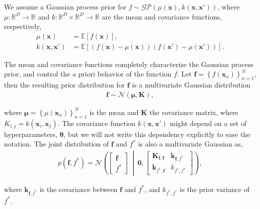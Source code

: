 \documentclass[]{interact}
\theoremstyle{plain}%
\theoremstyle{definition}
\theoremstyle{remark}
\begin{document}
We assume a Gaussian process prior for $f \sim \mathcal{GP}(\mu(\mathbf{x}), k(\mathbf{x}, \mathbf{x}'))$, where $\mu: \mathbb{R}^D \rightarrow \mathbb{R}$ and $k: \mathbb{R}^D \times \mathbb{R}^D \rightarrow \mathbb{R}$ are the mean and covariance functions, respectively,
%
\begin{align*}
 	\mu(\mathbf{x}) &= \mathbb{E}\!\left[f(\mathbf{x})\right],\\ 
 	k(\mathbf{x}, \mathbf{x}') &= \mathbb{E}\!\left[\left( f(\mathbf{x}) - \mu(\mathbf{x}) \right)\left( f(\mathbf{x}') - \mu(\mathbf{x}') \right)\right].
\end{align*} 

The mean and covariance functions completely characterize the Gaussian process prior, and control the a priori behavior of the function $f$. Let $\mathbf{f}=\left\lbrace f(\mathbf{x}_n) \right\rbrace_{n=1}^N$, then the resulting prior distribution for $\mathbf{f}$ is a multivariate Gaussian distribution
%
\begin{align*}
\mathbf{f} \sim \mathcal{N}(\boldsymbol{\mu}, \mathbf{K}),
\end{align*}

\noindent where $\boldsymbol{\mu} = \left\lbrace \mu(\mathbf{x}_n) \right\rbrace_{n=1}^N$ is the mean and $\mathbf{K}$ the covariance matrix, where $K_{i,j}=k(\mathbf{x}_i,\mathbf{x}_j)$. The covariance function $k(\textbf{x}, \textbf{x}')$ might depend on a set of hyperparameters, $\bm{\theta}$, but we will not write this dependency explicitly to ease the notation.
The joint distribution of $\mathbf{f}$ and $f^*$ is also a multivariate Gaussian as,
%
\begin{align*}
p(\mathbf{f}, f^*)=\mathcal{N} \left( \left[ \begin{array}{cc}
\mathbf{f} \\ 
f^*
\end{array} \right] \,\middle|\, \mathbf{0},\left[ \begin{array}{cc}
\mathbf{K}_{\mathbf{f},\mathbf{f}} & \mathbf{k}_{\mathbf{f},f^*} \\ 
\mathbf{k}_{f^*,\mathbf{f}} & k_{f^*,f^*}
\end{array} \right] \right),
\end{align*} 

\noindent where $\mathbf{k}_{\mathbf{f},f^*}$ is the covariance between $\mathbf{f}$ and $f^*$, and $k_{f^*,f^*}$ is the prior variance of $f^*$. %
\end{document}
